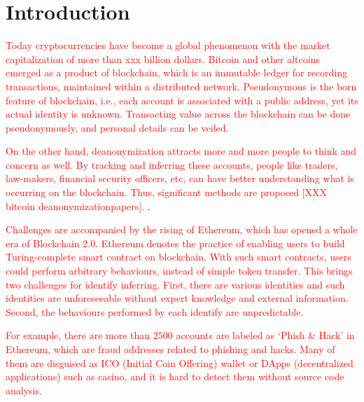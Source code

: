 \section{Introduction}
\textcolor{red}{
Today cryptocurrencies have become a global phenomenon with the market capitalization of more than xxx billion dollars. Bitcoin and other altcoins emerged as a product of blockchain, which is an immutable ledger for recording transactions, maintained within a distributed network. Pseudonymous is the born feature of blockchain, i.e., each account is associated with a public address, yet its actual identity is unknown. Transacting value across the blockchain can be done pseudonymously, and personal details can be veiled.
}

\textcolor{red}{
On the other hand, deanonymization attracts more and more people to think and concern as well. By tracking and inferring these accounts, people like traders, law-makers, financial security officers, etc, can have better understanding what is occurring on the blockchain. Thus, significant methods are proposed [XXX bitcoin deanonymizationpapers]. 
}.

\textcolor{red}{
Challenges are accompanied by the rising of Ethereum, which has opened a whole era of Blockchain 2.0. Ethereum denotes the practice of enabling users to build Turing-complete smart contract on blockchain. With such smart contracts, users could perform arbitrary behaviours, instead of simple token transfer. This brings two challenges for identify inferring. First, there are various identities and such identities are unforeseeable without expert knowledge and external information. Second, the behaviours performed by each identify are unpredictable.
}

\textcolor{red}{
For example, there are more than $2500$ accounts are labeled as `Phish \& Hack' in Ethereum, which are fraud addresses related to phishing and hacks. Many of them are disguised as ICO (Initial Coin Offering) wallet or DApps (decentralized applications) such as casino, and it is hard to detect them without source code analysis. 
}

